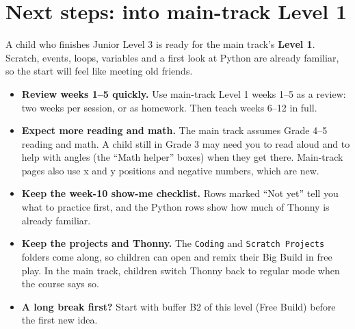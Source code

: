 \documentclass[track=junior,level=3,teacher]{kidscode}
\begin{document}
\section{Next steps: into main-track Level 1}
A child who finishes Junior Level 3 is ready for the main track's \textbf{Level 1}. Scratch, events,
loops, variables and a first look at Python are already familiar, so the start will feel like
meeting old friends.

\begin{itemize}[itemsep=2pt]
  \item \textbf{Review weeks 1--5 quickly.} Use main-track Level 1 weeks 1--5 as a review: two weeks per
        session, or as homework. Then teach weeks 6--12 in full.
  \item \textbf{Expect more reading and math.} The main track assumes Grade 4--5 reading and math. A
        child still in Grade 3 may need you to read aloud and to help with angles (the \enquote{Math
        helper} boxes) when they get there. Main-track pages also use x and y positions and negative
        numbers, which are new.
  \item \textbf{Keep the week-10 show-me checklist.} Rows marked \enquote{Not yet} tell you what to
        practice first, and the Python rows show how much of Thonny is already familiar.
  \item \textbf{Keep the projects and Thonny.} The \texttt{Coding} and \texttt{Scratch Projects} folders
        come along, so children can open and remix their Big Build in free play. In the main track,
        children switch Thonny back to regular mode when the course says so.
  \item \textbf{A long break first?} Start with buffer B2 of this level (Free Build) before the first
        new idea.
\end{itemize}
\end{document}
